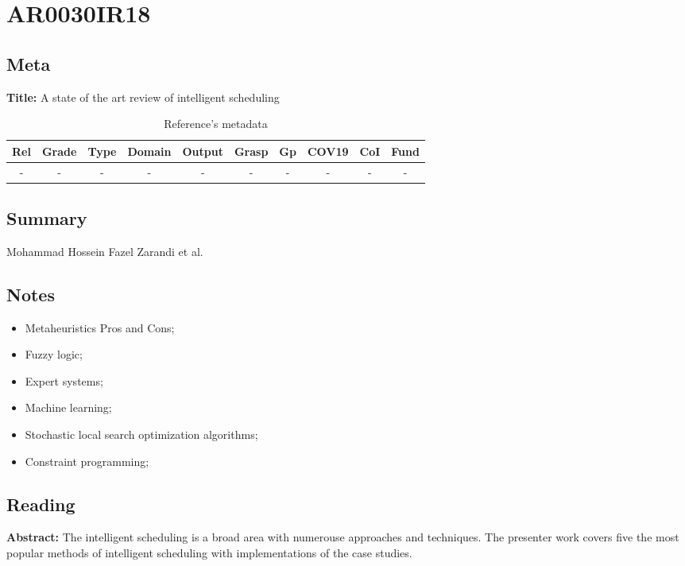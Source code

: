 \section{ AR0030IR18 }


\subsection{Meta}

    \textbf{Title:}
    A state of the art review of intelligent scheduling

    \begin{table}[H]
        \centering
        \begin{tabular}{|c|c|c|c|c|c|c|c|c|c|}
            \hline
                \textbf{Rel} & \textbf{Grade} & \textbf{Type} & \textbf{Domain} & \textbf{Output}  & \textbf{Grasp}   & \textbf{Gp} & \textbf{COV19} & \textbf{CoI} & \textbf{Fund} \\
            \hline
             - & - & - & - & - & - & - & - & - & - \\
            \hline
        \end{tabular}
        \caption{Reference's metadata}
        \label{tab:AR0030IR18}
    \end{table}

\subsection{Summary}
    Mohammad Hossein Fazel Zarandi et al. \cite{032IRSchedulingReview2020} 

\subsection{Notes}
    \begin{itemize}
        \item Metaheuristics Pros and Cons;
        \item Fuzzy logic;
        \item Expert systems;
        \item Machine learning;
        \item Stochastic local search optimization algorithms;
        \item Constraint programming;
    \end{itemize}


\subsection{Reading}
    \textbf{Abstract:}
        The intelligent scheduling is a broad area with numerouse approaches and techniques. The presenter work covers five the most popular methods of intelligent scheduling with implementations of the case studies.
    
